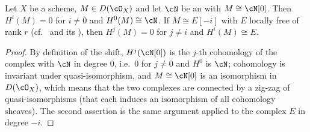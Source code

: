 \begin{lemma}
\label{lem:pc-degree-zero-properties}
Let $X$ be a scheme, $M\in D(\cO_X)$ and let $\cN$ be an
 with
$M\cong\cN[0]$.  Then $H^i(M)=0$ for $i\neq0$ and $H^0(M)\cong\cN$.  If
$M\cong E[-i]$ with $E$ locally free of rank $r$ (cf.\
 and its ),
then $H^j(M)=0$ for $j\neq i$ and $H^i(M)\cong E$.
\end{lemma}
\begin{proof}
By definition of the shift, $H^j(\cN[0])$ is the $j$-th cohomology of
the complex with $\cN$ in degree $0$, i.e.\ $0$ for $j\ne0$ and $H^0$ is
$\cN$; cohomology is invariant under quasi-isomorphism, and
$M\cong\cN[0]$ is an isomorphism in $D(\cO_X)$, which means that the
two complexes are connected by a zig-zag of quasi-isomorphisms (that
each induces an isomorphism of all cohomology sheaves).  The second
assertion is the same argument applied to the complex $E$ in degree
$-i$.
\end{proof}

